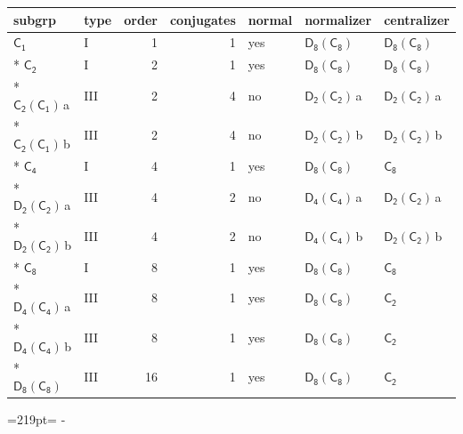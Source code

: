 \documentclass[10pt,a4paper]{article}
\newcommand{\needspace}[1]{\par\penalty-100\begingroup\dimen0=#1\relax\dimen2=\pagegoal
  \advance\dimen2-\pagetotal\ifdim\dimen0>\dimen2\relax\ifdim\dimen2>0pt\vfil\break\fi\fi
  \endgroup}
\numberwithin{equation}{section}
\newcommand{\grp}[1]{\mathsf{#1}}
\newcommand{\clsletter}[1]{\,{\scriptsize\color{black!55}#1}}
\begin{document}
{\small\begin{longtable}{@{}llrrlll@{}}\toprule
subgrp & type & order & conjugates & normal & normalizer & centralizer\\\midrule\endhead
\bottomrule\endfoot\endlastfoot
\href{../../../rotation/data/pdf/C1.pdf}{$\grp{C_{1}}$} & I & 1 & 1 & yes & \href{D8-C8.pdf}{$\grp{D_{8}}(\grp{C_{8}})$} & \href{D8-C8.pdf}{$\grp{D_{8}}(\grp{C_{8}})$}\\*
\href{../../../rotation/data/pdf/C2.pdf}{$\grp{C_{2}}$} & I & 2 & 1 & yes & \href{D8-C8.pdf}{$\grp{D_{8}}(\grp{C_{8}})$} & \href{D8-C8.pdf}{$\grp{D_{8}}(\grp{C_{8}})$}\\*
\href{C2-C1.pdf}{$\grp{C_{2}}(\grp{C_{1}})$}\clsletter{a} & III & 2 & 4 & no & \href{D2-C2.pdf}{$\grp{D_{2}}(\grp{C_{2}})$}\clsletter{a} & \href{D2-C2.pdf}{$\grp{D_{2}}(\grp{C_{2}})$}\clsletter{a}\\*
\href{C2-C1.pdf}{$\grp{C_{2}}(\grp{C_{1}})$}\clsletter{b} & III & 2 & 4 & no & \href{D2-C2.pdf}{$\grp{D_{2}}(\grp{C_{2}})$}\clsletter{b} & \href{D2-C2.pdf}{$\grp{D_{2}}(\grp{C_{2}})$}\clsletter{b}\\*
\href{../../../rotation/data/pdf/C4.pdf}{$\grp{C_{4}}$} & I & 4 & 1 & yes & \href{D8-C8.pdf}{$\grp{D_{8}}(\grp{C_{8}})$} & \href{../../../rotation/data/pdf/C8.pdf}{$\grp{C_{8}}$}\\*
\href{D2-C2.pdf}{$\grp{D_{2}}(\grp{C_{2}})$}\clsletter{a} & III & 4 & 2 & no & \href{D4-C4.pdf}{$\grp{D_{4}}(\grp{C_{4}})$}\clsletter{a} & \href{D2-C2.pdf}{$\grp{D_{2}}(\grp{C_{2}})$}\clsletter{a}\\*
\href{D2-C2.pdf}{$\grp{D_{2}}(\grp{C_{2}})$}\clsletter{b} & III & 4 & 2 & no & \href{D4-C4.pdf}{$\grp{D_{4}}(\grp{C_{4}})$}\clsletter{b} & \href{D2-C2.pdf}{$\grp{D_{2}}(\grp{C_{2}})$}\clsletter{b}\\*
\href{../../../rotation/data/pdf/C8.pdf}{$\grp{C_{8}}$} & I & 8 & 1 & yes & \href{D8-C8.pdf}{$\grp{D_{8}}(\grp{C_{8}})$} & \href{../../../rotation/data/pdf/C8.pdf}{$\grp{C_{8}}$}\\*
\href{D4-C4.pdf}{$\grp{D_{4}}(\grp{C_{4}})$}\clsletter{a} & III & 8 & 1 & yes & \href{D8-C8.pdf}{$\grp{D_{8}}(\grp{C_{8}})$} & \href{../../../rotation/data/pdf/C2.pdf}{$\grp{C_{2}}$}\\*
\href{D4-C4.pdf}{$\grp{D_{4}}(\grp{C_{4}})$}\clsletter{b} & III & 8 & 1 & yes & \href{D8-C8.pdf}{$\grp{D_{8}}(\grp{C_{8}})$} & \href{../../../rotation/data/pdf/C2.pdf}{$\grp{C_{2}}$}\\*
\href{D8-C8.pdf}{$\grp{D_{8}}(\grp{C_{8}})$} & III & 16 & 1 & yes & \href{D8-C8.pdf}{$\grp{D_{8}}(\grp{C_{8}})$} & \href{../../../rotation/data/pdf/C2.pdf}{$\grp{C_{2}}$}\\
\bottomrule\end{longtable}}
\needspace{219pt}
\end{document}
